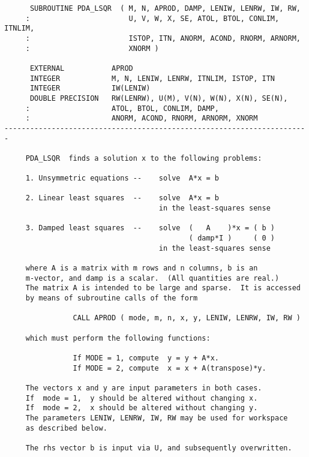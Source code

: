 \begin{verbatim}
      SUBROUTINE PDA_LSQR  ( M, N, APROD, DAMP, LENIW, LENRW, IW, RW,
     :                       U, V, W, X, SE, ATOL, BTOL, CONLIM, ITNLIM,
     :                       ISTOP, ITN, ANORM, ACOND, RNORM, ARNORM,
     :                       XNORM )

      EXTERNAL           APROD
      INTEGER            M, N, LENIW, LENRW, ITNLIM, ISTOP, ITN
      INTEGER            IW(LENIW)
      DOUBLE PRECISION   RW(LENRW), U(M), V(N), W(N), X(N), SE(N),
     :                   ATOL, BTOL, CONLIM, DAMP,
     :                   ANORM, ACOND, RNORM, ARNORM, XNORM
-----------------------------------------------------------------------

     PDA_LSQR  finds a solution x to the following problems:

     1. Unsymmetric equations --    solve  A*x = b

     2. Linear least squares  --    solve  A*x = b
                                    in the least-squares sense

     3. Damped least squares  --    solve  (   A    )*x = ( b )
                                           ( damp*I )     ( 0 )
                                    in the least-squares sense

     where A is a matrix with m rows and n columns, b is an
     m-vector, and damp is a scalar.  (All quantities are real.)
     The matrix A is intended to be large and sparse.  It is accessed
     by means of subroutine calls of the form

                CALL APROD ( mode, m, n, x, y, LENIW, LENRW, IW, RW )

     which must perform the following functions:

                If MODE = 1, compute  y = y + A*x.
                If MODE = 2, compute  x = x + A(transpose)*y.

     The vectors x and y are input parameters in both cases.
     If  mode = 1,  y should be altered without changing x.
     If  mode = 2,  x should be altered without changing y.
     The parameters LENIW, LENRW, IW, RW may be used for workspace
     as described below.

     The rhs vector b is input via U, and subsequently overwritten.



\end{verbatim}
